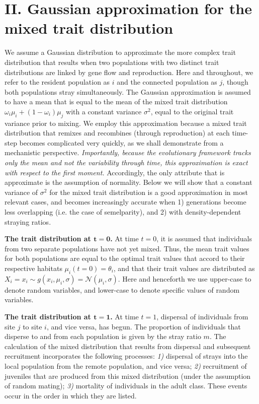 \documentclass{revtex4}
\begin{document}
\section*{II. Gaussian approximation for the mixed trait distribution}
We assume a Gaussian distribution to approximate the more complex trait distribution that results when two populations with two distinct trait distributions are linked by gene flow and reproduction.
Here and throughout, we refer to the resident population as $i$ and the connected population as $j$, though both populations stray simultaneously.
The Gaussian approximation is assumed to have a mean that is equal to the mean of the mixed trait distribution $\omega_i\mu_i + (1-\omega_i)\mu_j$ with a constant variance $\sigma^2$, equal to the original trait variance prior to mixing.
We employ this approximation because a mixed trait distribution that remixes and recombines (through reproduction) at each time-step becomes complicated very quickly, as we shall demonstrate from a mechanistic perspective.
\emph{Importantly, because the evolutionary framework tracks only the mean and not the variability through time, this approximation is exact with respect to the first moment.}
Accordingly, the only attribute that is approximate is the assumption of normality.
Below we will show that a constant variance of $\sigma^2$ for the mixed trait distribution is a good approximation in most relevant cases, and becomes increasingly accurate when 1) generations become less overlapping (i.e. the case of semelparity), and 2) with density-dependent straying ratios.


{\bf The trait distribution at $\bm{t=0}$.} At time $t=0$, it is assumed that individuals from two separate populations have not yet mixed. 
Thus, the mean trait values for both populations are equal to the optimal trait values that accord to their respective habitats $\mu_i(t=0) = \theta_i$, and that their trait values are distributed as $X_i=x_i \sim g(x_i,\mu_i,\sigma) = \mathcal{N}(\mu_i,\sigma)$.
Here and henceforth we use upper-case to denote random variables, and lower-case to denote specific values of random variables.

{\bf The trait distribution at $\bm{t=1}$.} At time $t=1$, dispersal of individuals from site $j$ to site $i$, and vice versa, has begun.
The proportion of individuals that disperse to and from each population is given by the stray ratio $m$.
The calculation of the mixed distribution that results from dispersal and subsequent recruitment incorporates the following processes:
\emph{1)} dispersal of strays into the local population from the remote population, and vice versa;
\emph{2)} recruitment of juveniles that are produced from this mixed distribution (under the assumption of random mating); 
\emph{3)} mortality of individuals in the adult class.
These events occur in the order in which they are listed.
\end{document}
